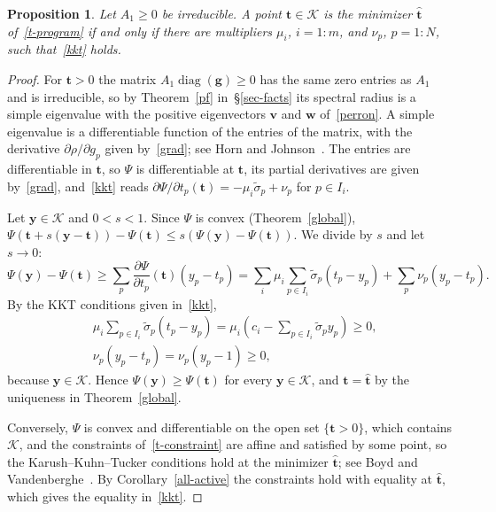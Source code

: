 \documentclass[11pt]{article}
\theoremstyle{plain}
\newtheorem{proposition}[theorem]{Proposition}
\theoremstyle{definition}
\theoremstyle{remark}
\numberwithin{equation}{section}
\numberwithin{figure}{section}
\numberwithin{table}{section}
\numberwithin{algorithm}{section}
\begin{document}
\begin{proposition}\label{kkt-sufficient}
Let $A_1\ge 0$ be irreducible. A point $\bm t\in\mathcal{K}$ is the minimizer
$\widehat{\bm t}$ of~\eqref{t-program} if and only if there are multipliers
$\mu_i$, $i=1:m$, and $\nu_p$, $p=1:N$, such that~\eqref{kkt}
holds.
\end{proposition}
\begin{proof}
For $\bm t>0$ the matrix $A_1\operatorname{diag}(\bm g)\ge 0$ has the same
zero entries as $A_1$ and is irreducible, so by Theorem~\ref{pf}
in~\S\ref{sec-facts} its spectral radius is a simple eigenvalue with the
positive eigenvectors $\bm v$ and $\bm w$ of~\eqref{perron}. A simple
eigenvalue is a differentiable function of the entries of the matrix, with
the derivative $\partial\rho/\partial g_p$ given by~\eqref{grad}; see
Horn and Johnson~\cite[Section 6.3]{1985Horn_Johnson}. The entries are differentiable in $\bm t$,
so $\Psi$ is differentiable at $\bm t$, its partial derivatives are given
by~\eqref{grad}, and~\eqref{kkt} reads
$\partial\Psi/\partial t_p(\bm t)=-\mu_i\widetilde\sigma_p+\nu_p$ for $p\in I_i$.

Let $\bm y\in\mathcal{K}$ and $0<s<1$. Since $\Psi$ is convex
(Theorem~\ref{global}),
$\Psi\left(\bm t+s(\bm y-\bm t)\right)-\Psi(\bm t)\le s\left(\Psi(\bm y)-\Psi(\bm t)\right)$.
We divide by $s$ and let $s\to 0$:
\begin{equation}
\Psi(\bm y)-\Psi(\bm t)\ge\sum_p\frac{\partial\Psi}{\partial t_p}(\bm t)\left(y_p-t_p\right)
=\sum_i\mu_i\sum_{p\in I_i}\widetilde\sigma_p\left(t_p-y_p\right)
+\sum_p\nu_p\left(y_p-t_p\right).
\end{equation}
By the KKT conditions given in~\eqref{kkt},
\begin{align*}
&\mu_i\sum_{p\in I_i}\widetilde\sigma_p\left(t_p-y_p\right)
=\mu_i\left(c_i-\sum_{p\in I_i}\widetilde\sigma_py_p\right)\ge 0,\\
&\nu_p\left(y_p-t_p\right)=\nu_p\left(y_p-1\right)\ge 0,
\end{align*}
because $\bm y\in\mathcal{K}$. Hence $\Psi(\bm y)\ge\Psi(\bm t)$ for every
$\bm y\in\mathcal{K}$, and $\bm t=\widehat{\bm t}$ by the uniqueness in
Theorem~\ref{global}.

Conversely, $\Psi$ is convex and differentiable on the open set
$\{\bm t>0\}$, which contains $\mathcal{K}$, and the constraints
of~\eqref{t-constraint} are affine and satisfied by some point, so
the Karush--Kuhn--Tucker conditions hold at the minimizer
$\widehat{\bm t}$; see Boyd and
Vandenberghe~\cite[Sections 5.2.3 and 5.5.3]{2004Boyd_Vandenberghe}. By
Corollary~\ref{all-active} the constraints hold with equality at
$\widehat{\bm t}$, which gives the equality in~\eqref{kkt}.
\end{proof}
\end{document}

